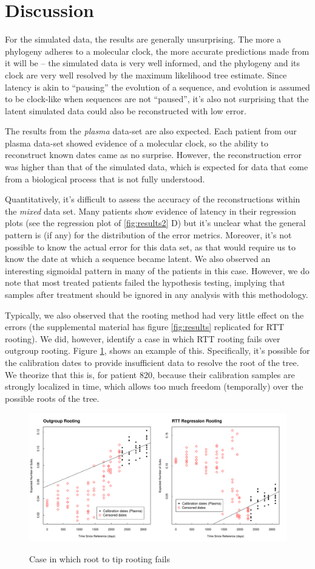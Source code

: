 \section{Discussion} \label{sec:discuss}
For the simulated data, the results are generally unsurprising. 
The more a phylogeny adheres to a molecular clock, the more accurate predictions made from it will be -- the simulated data is very well informed, and the phylogeny and its clock are very well resolved by the maximum likelihood tree estimate. 
Since latency is akin to ``pausing'' the evolution of a sequence, and evolution is assumed to be clock-like when sequences are not ``paused'', it's also not surprising that the latent simulated data could also be reconstructed with low error. 

The results from the {\em plasma} data-set are also expected. 
Each patient from our plasma data-set showed evidence of a molecular clock, so the ability to reconstruct known dates came as no surprise. 
However, the reconstruction error was higher than that of the simulated data, which is expected for data that come from a biological process that is not fully understood.

Quantitatively, it's difficult to assess the accuracy of the reconstructions within the {\em mixed} data set. 
Many patients show evidence of latency in their regression plots (see the regression plot of \ref{fig:results2} D) but it's unclear what the general pattern is (if any) for the distribution of the error metrics. 
Moreover, it's not possible to know the actual error for this data set, as that would require us to know the date at which a sequence became latent. 
We also observed an interesting sigmoidal pattern in many of the patients in this case.
However, we do note that most treated patients failed the hypothesis testing, implying that samples after treatment should be ignored in any analysis with this methodology.

Typically, we also observed that the rooting method had very little effect on the errors (the supplemental material has figure \ref{fig:results} replicated for RTT rooting). 
We did, however, identify a case in which RTT rooting fails over outgroup rooting.
Figure \ref{fig:degenerate_example}, shows an example of this. 
Specifically, it's possible for the calibration dates to provide insufficient data to resolve the root of the tree. 
We theorize that this is, for patient 820, because their calibration samples are strongly localized in time, which allows too much freedom (temporally) over the possible roots of the tree. 

\begin{figure}[!ht] \label{fig:degenerate_example}
	\centering
	\includegraphics[scale=0.425]{figures/rtt.pdf} \\
	\caption[Example of bad root]{ Case in which root to tip rooting fails}
\end{figure}

